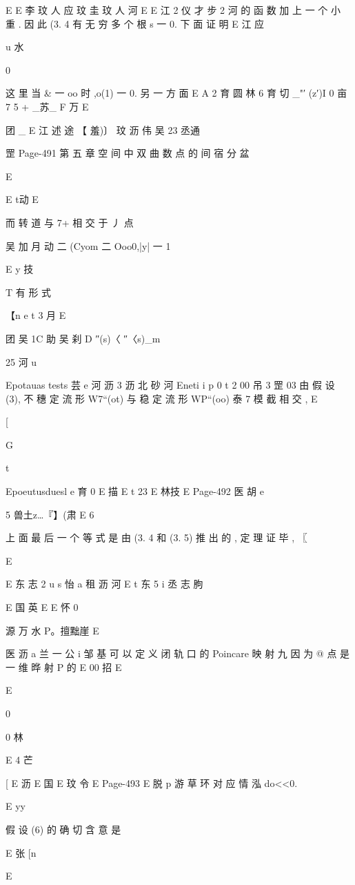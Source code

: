 {{{{E
E 李 玟 人 应 玟 圭 玟 人 河
E
E 江 2 仪 才 步 2 河
的 函 数 加 上 一 个 小 重 . 因 此 (3. 4 有 无 穷 多 个 根 s 一 0. 下 面 证 明
E 江 应

u 水

0

这 里 当 & 一 oo 时 ,o(1) 一 0. 另 一 方 面
E A 2 育 圆 林 6 育 切
_"′ (z′)I 0 亩 7 5 + _苏_ F 万 E

团 _ E 江 述 途
【 羞)〕 玟 沥 伟 吴 23 丞通

罡
Page-491
第 五 章 空 间 中 双 曲 数 点 的 间 宿 分 盆

E

E t动
E

而 转 道 与 7+ 相 交 于 丿 点

吴 加 月 动 二 (Cyom 二 Ooo0,|y| 一 1

E y 技

T 有 形 式

【n e t 3 月
E

团 吴 1C 助 吴 刹
D ″(s)〈 ″〈s)_m

25 河 u

Epotauas tests 芸 e 河 沥 3 沥 北 砂 河
Eneti i p
0 t 2 00 吊 3 罡 03
由 假 设 (3), 不 穗 定 流 形 W7“(ot) 与 稳 定 流 形 WP“(oo) 泰 7 模 截 相 交 ,
E

[

G

t

Epoeutusduesl e 育 0
E 描
E t 23
E 林技
E
Page-492
医 胡 e

5 兽土z…『】(肃 E 6

上 面 最 后 一 个 等 式 是 由 (3. 4 和 (3. 5) 推 出 的 , 定 理 证 毕 , 〖

E

E 东 志 2 u s 怡 a 租 沥 河
E t 东 5 i 丞 志 朐

E 国 英
E
E 怀 0

源 万 水 P。擅黜崖 E

医 沥 a 兰 一 公 i
邹 基 可 以 定 义 闭 轨 口 的 Poincare 映 射 九 因 为 @ 点 是 一 维 晔 射 P 的
E 00 招
E

E

0

0 林

E 4 芒

[
E 沥
E
国
E
玟
令
E
Page-493
E 脱 p
游 草 环 对 应 情 泓 do<<0.

E yy

假 设 (6) 的 确 切 含 意 是

E
张 [n

E

}}}}

